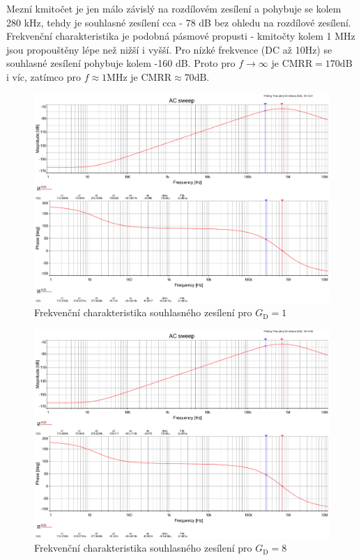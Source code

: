 \documentclass[twoside]{article}
\begin{document}
Mezní kmitočet je jen málo závislý na rozdílovém zesílení a pohybuje se kolem 280 \si{\kilo\hertz}, 
tehdy je souhlasné zesílení cca - 78 \si{\deci\bel} bez ohledu na rozdílové zesílení.
Frekvenční charakteristika je podobná pásmové propusti - kmitočty kolem 1 \si{\mega\hertz} jsou propouštěny lépe
než nižší i vyšší. Pro nízké frekvence (DC až 10\si{\hertz}) se souhlasné zesílení pohybuje kolem -160 \si{\deci\bel}.
Proto pro $f\to\infty$ je $\text{CMRR} = 170 \si{\deci\bel}$ i víc, zatímco pro $f \approx 1\si{\mega\hertz}$ je $\text{CMRR} \approx 70 \si{\deci\bel}$.

\begin{figure}[h!]
    \centering
    \includegraphics[width=0.92\linewidth]{bode_common_1.pdf}
    \caption{Frekvenční charakteristika souhlasného zesílení pro $G_\text{D} = 1$}
    \label{fig:bode_common_1}
\end{figure}

\begin{figure}[h!]
    \centering
    \includegraphics[width=0.92\linewidth]{bode_common_8.pdf}
    \caption{Frekvenční charakteristika souhlasného zesílení pro $G_\text{D} = 8$}
    \label{fig:bode_common_8}
\end{figure}
\newpage
\end{document}
